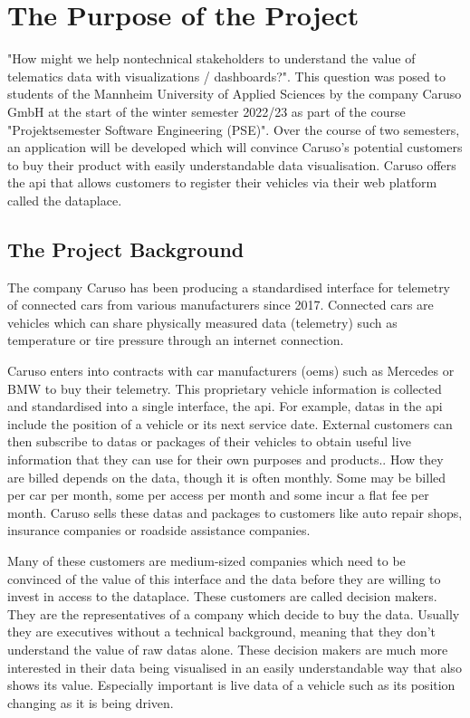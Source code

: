 \chapter{The Purpose of the Project}
"How might we help \gls{nontechnical} \glspl{stakeholder} to understand the value of telematics data with visualizations / dashboards?". This question was posed to students of the Mannheim University of Applied Sciences by the company Caruso GmbH at the start of the winter semester 2022/23 as part of the course "Projektsemester Software Engineering (PSE)". Over the course of two semesters, an application will be developed which will convince Caruso's potential customers to buy their product with easily understandable data visualisation. Caruso offers the \gls{api} that allows customers to register their vehicles via their web platform called the \gls{dataplace}.

\section{The Project Background}
The company Caruso has been producing a standardised interface for \gls{telemetry} of connected cars from various manufacturers since 2017. Connected cars are vehicles which can share physically measured data (\gls{telemetry}) such as temperature or tire pressure through an internet connection.

Caruso enters into contracts with car manufacturers (\glspl{oem}) such as Mercedes or BMW to buy their \gls{telemetry}. This proprietary vehicle information is collected and standardised into a single interface, the \gls{api}. For example, \glspl{data} in the \gls{api} include the position of a vehicle or its next service date. External customers can then subscribe to \glspl{data} or packages of their vehicles to obtain useful live information that they can use for their own purposes and products.. How they are billed depends on the \gls{data}, though it is often monthly. Some may be billed per car per month, some per access per month and some incur a flat fee per month. Caruso sells these \glspl{data} and packages to customers like auto repair shops, insurance companies or roadside assistance companies. 

Many of these customers are medium-sized companies which need to be convinced of the value of this interface and the data before they are willing to invest in access to the \gls{dataplace}. These customers are called decision makers. They are the representatives of a company which decide to buy the data. Usually they are executives without a technical background, meaning that they don't understand the value of raw \glspl{data} alone. These decision makers are much more interested in their data being visualised in an easily understandable way that also shows its value. Especially important is live data of a vehicle such as its position changing as it is being driven.


